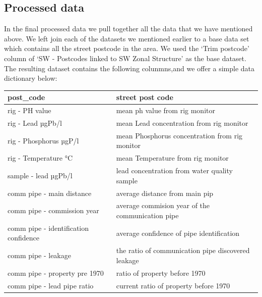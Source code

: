 \documentclass[11pt,twoside]{article}
\numberwithin{Theorem}{section}
\numberwithin{Definition}{section}
\numberwithin{Lemma}{section}
\numberwithin{Algorithm}{section}
\numberwithin{equation}{section}
\begin{document}
\subsection{Processed data}
In the final processed data we pull together all the data that we have mentioned above. We left join each of the datasets we mentioned earlier to a base data set which contains all the street postcode in the area. We used the `Trim postcode' column of `SW - Postcodes linked to SW Zonal Structure' as the base dataset. The resulting dataset contains the following colunmns,and we offer a simple data dictionary below:
\begin{center}
    \begin{tabular}{ll}
        \hline
        post\_code                                 &
        street post code\\
        \hline
        rig - PH value                             &
        mean ph value from rig monitor\\
        \hline
        rig - Lead µgPb/l                          &
        mean Lead concentration from rig monitor\\
        \hline
        rig - Phosphorus µgP/l                     &
        mean Phosphorus concentration from rig monitor\\
        \hline
        rig - Temperature °C                       &
        mean Temperature from rig monitor\\
        \hline
        sample - lead µgPb/l                       &
        lead concentration from water quality sample\\
        \hline
        comm pipe - main distance                   &
        average distance from main pip\\
        \hline
        comm pipe - commission year                 &
        average commision year of the communication pipe\\
        \hline
        comm pipe - identification confidence       &
        average confidence of pipe identification\\
        \hline
        comm pipe - leakage                         &
        the ratio of communication pipe discovered leakage\\
        \hline
        comm pipe - property pre 1970               &
        ratio of property before 1970\\
        \hline
        comm pipe - lead pipe ratio                  &
        current ratio of property before 1970\\

\end{tabular}
\end{center}
\end{document}

